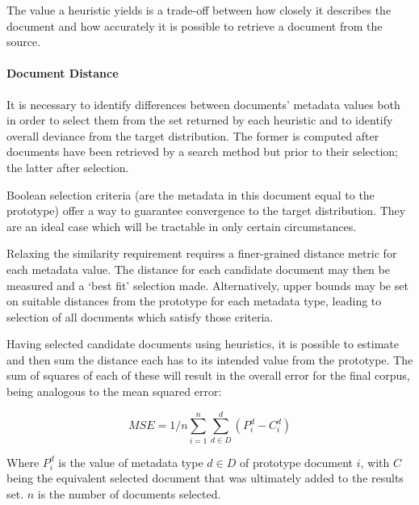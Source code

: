 The value a heuristic yields is a trade-off between how closely it describes the document and how accurately it is possible to retrieve a document from the source.


\paragraph{Document Distance}
It is necessary to identify differences between documents' metadata values both in order to select them from the set returned by each heuristic and to identify overall deviance from the target distribution.  The former is computed after documents have been retrieved by a search method but prior to their selection; the latter after selection.

Boolean selection criteria (are the metadata in this document equal to the prototype) offer a way to guarantee convergence to the target distribution.  They are an ideal case which will be tractable in only certain circumstances.

Relaxing the similarity requirement requires a finer-grained distance metric for each metadata value.  The distance for each candidate document may then be measured and a `best fit' selection made.  Alternatively, upper bounds may be set on suitable distances from the prototype for each metadata type, leading to selection of all documents which satisfy those criteria.

Having selected candidate documents using heuristics, it is possible to estimate and then sum the distance each has to its intended value from the prototype.  The sum of squares of each of these will result in the overall error for the final corpus, being analogous to the mean squared error:

$$
MSE = 1/n\sum_{i=1}^{n}\sum_{d \in D}^{d}{(P_i^d - C_i^d)}
$$ 

Where $P_i^d$ is the value of metadata type $d \in D$ of prototype document $i$, with $C$ being the equivalent selected document that was ultimately added to the results set.  $n$ is the number of documents selected.









